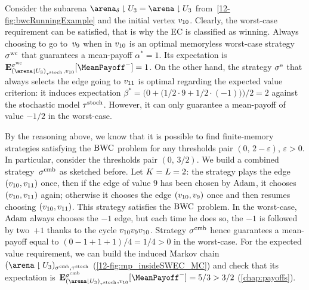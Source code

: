 \begin{example}
Consider the subarena $\gameNonZero \reduc \ec_{3} = \arena \reduc \ec_{3}$ from~\cref{12-fig:bwcRunningExample} and the initial vertex $v_{10}$. Clearly, the worst-case requirement can be satisfied, that is why the EC is classified as winning. Always choosing to go to~$v_{9}$ when in $v_{10}$ is an optimal memoryless worst-case strategy $\sigma^{\text{wc}}$ that guarantees a mean-payoff $\alpha^\ast = 1$. Its expectation is $\expv^{\stratWC}_{(\arena \reduc \ec_{3})_{\tau^\text{stoch}},v_{10}}[\MeanPayoff^{-}] = 1$. On the other hand, the strategy $\sigma^{\text{e}}$ that always selects the edge going to $v_{11}$ is optimal regarding the expected value criterion: it induces expectation $\beta^\ast = \big(0 + \big(1/2 \cdot 9 + 1/2 \cdot (-1)\big)\big)/2 = 2$ against the stochastic model $\tau^{\text{stoch}}$. However, it can only guarantee a mean-payoff of value $-1/2$ in the worst-case.

By the reasoning above, we know that it is possible to find finite-memory strategies satisfying the $\text{BWC}$ problem for any thresholds pair $(0,\, 2 - \varepsilon)$, $\varepsilon > 0$. In particular, consider the thresholds pair $(0,\, 3/2)$. We build a combined strategy~$\sigma^{\text{cmb}}$ as sketched before. Let $K = L = 2$: the strategy plays the edge $(v_{10}, v_{11})$ once, then if the edge of value $9$ has been chosen by $\text{Adam}$, it chooses $(v_{10}, v_{11})$ again; otherwise it chooses the edge $(v_{10}, v_{9})$ once and then resumes choosing $(v_{10}, v_{11})$. This strategy satisfies the $\text{BWC}$ problem. In the worst-case,~$\text{Adam}$ always chooses the $-1$ edge, but each time he does so, the $-1$ is followed by two~$+1$ thanks to the cycle $v_{10} v_{9} v_{10}$. Strategy $\sigma^{\text{cmb}}$ hence guarantees a mean-payoff equal to $(0 - 1 + 1 + 1)/4 = 1/4 > 0$ in the worst-case. For the expected value requirement, we can build the induced Markov chain $(\arena \reduc \ec_{3})_{\stratComb, \tau^\text{stoch}}$ (\cref{12-fig:mp_insideSWEC_MC}) and check that its expectation is $\expv^{\stratComb}_{(\arena \reduc \ec_{3})_{\tau^\text{stoch}},v_{10}}[\MeanPayoff^{-}] = 5/3 > 3/2$ (\cref{chap:payoffs}).


\end{example}
